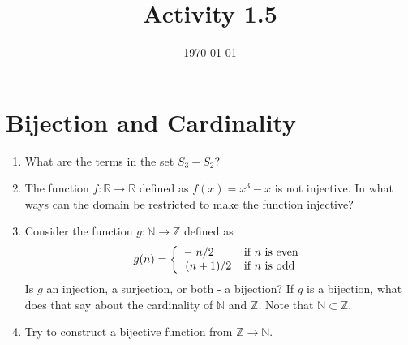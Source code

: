 \documentclass[12pt]{amsart}
\title{Activity 1.5}
\date{\today}
\begin{document}
\maketitle
\part*{Bijection and Cardinality}
\begin{enumerate}
\item What are the terms in the set $S_3 - S_2$?
\item The function $f: \mathbb{R} \to \mathbb{R}$ defined as $f(x) = x^3 - x$ is not injective. In what ways can the domain be restricted to make the function injective?
\item Consider the function $g: \mathbb{N} \to \mathbb{Z}$ defined as 
\begin{equation*}
g(n) = \left\{
    \begin{array}{ll}
        -\flatfrac{n}{2} & \text{if } n \text{ is even}\\
        \flatfrac{(n+1)}{2} & \text{if } n \text{ is odd}
    \end{array} 
    \right.
\end{equation*}
Is $g$ an injection, a surjection, or both - a bijection? If $g$ is a bijection, what does that say about the cardinality of $\mathbb{N}$ and $\mathbb{Z}$. Note that $\mathbb{N} \subset \mathbb{Z}$.
\item Try to construct a bijective function from $\mathbb{Z} \to \mathbb{N}$.
\end{enumerate}  
\end{document}
